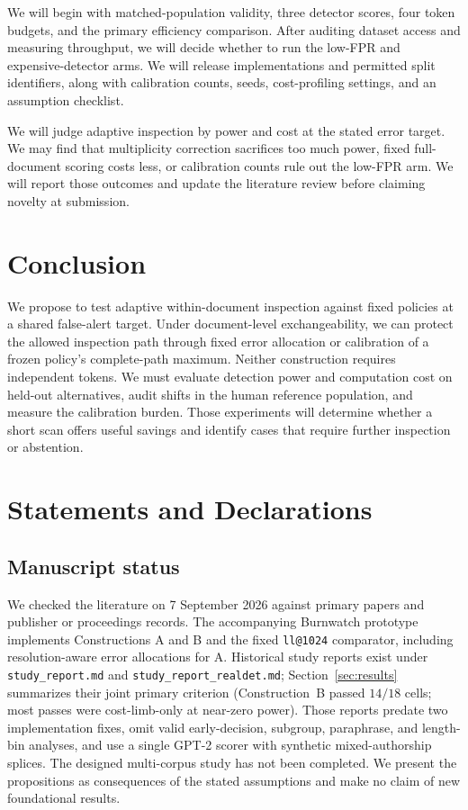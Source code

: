 \documentclass[pdflatex,sn-mathphys-num]{sn-jnl}
\begin{document}
We will begin with matched-population validity, three detector scores, four token budgets, and the primary efficiency comparison. After auditing dataset access and measuring throughput, we will decide whether to run the low-FPR and expensive-detector arms. We will release implementations and permitted split identifiers, along with calibration counts, seeds, cost-profiling settings, and an assumption checklist.

We will judge adaptive inspection by power and cost at the stated error target. We may find that multiplicity correction sacrifices too much power, fixed full-document scoring costs less, or calibration counts rule out the low-FPR arm. We will report those outcomes and update the literature review before claiming novelty at submission.

\section{Conclusion}

We propose to test adaptive within-document inspection against fixed policies at a shared false-alert target. Under document-level exchangeability, we can protect the allowed inspection path through fixed error allocation or calibration of a frozen policy's complete-path maximum. Neither construction requires independent tokens. We must evaluate detection power and computation cost on held-out alternatives, audit shifts in the human reference population, and measure the calibration burden. Those experiments will determine whether a short scan offers useful savings and identify cases that require further inspection or abstention.

\ifSpringerFormat
  \backmatter
\fi

\section*{Statements and Declarations}

\subsection*{Manuscript status}
We checked the literature on 7 September 2026 against primary papers and publisher or proceedings records. The accompanying Burnwatch prototype implements Constructions A and B and the fixed \texttt{ll@1024} comparator, including resolution-aware error allocations for A. Historical study reports exist under \texttt{study\_report.md} and \texttt{study\_report\_realdet.md}; Section~\ref{sec:results} summarizes their joint primary criterion (Construction~B passed \(14/18\) cells; most passes were cost-limb-only at near-zero power). Those reports predate two implementation fixes, omit valid early-decision, subgroup, paraphrase, and length-bin analyses, and use a single GPT-2 scorer with synthetic mixed-authorship splices. The designed multi-corpus study has not been completed. We present the propositions as consequences of the stated assumptions and make no claim of new foundational results.
\end{document}
